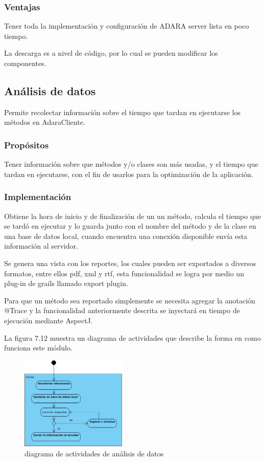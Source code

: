 \documentclass[12pt,a4paper,spanish,openany]{book}
\begin{document}
\subsubsection{Ventajas}
Tener toda la implementación y configuración de ADARA server lista en poco
tiempo.

La descarga es a nivel de código, por lo cual se pueden modificar los
componentes.



\subsection{Análisis de datos}
Permite recolectar información sobre el tiempo que tardan en ejecutarse los
métodos en AdaraCliente.

\subsubsection{Propósitos}
Tener información sobre que métodos y/o clases son más usadas, y el
tiempo que tardan en ejecutarse, con el fin de usarlos para la optimización de
la aplicación.

\subsubsection{Implementación}

Obtiene la hora de inicio y de finalización de un un método, calcula el tiempo
que se tardó en ejecutar y lo guarda junto con el nombre del método y de la
clase en una base de datos local, cuando encuentra una conexión
disponible envía esta información al servidor.

Se genera una vista con los reportes, los  cuales pueden ser exportados a
diversos formatos, entre ellos pdf, xml y rtf, esta funcionalidad se logra por
medio un plug-in de grails llamado export plugin.

Para que un método sea reportado simplemente se necesita agregar la anotación
@Trace y la funcionalidad anteriormente descrita se inyectará en tiempo de
ejecución mediante AspectJ.

La figura 7.12 muestra un diagrama de actividades que describe la forma en como
funciona este módulo.  

\begin{figure}[ht]
\begin{center}
 \includegraphics[width=0.45\textwidth]{./img/activAnalysis.jpg}
\caption{diagrama de actividades de análisis de datos}
\end{center}
\end{figure}
\end{document}
